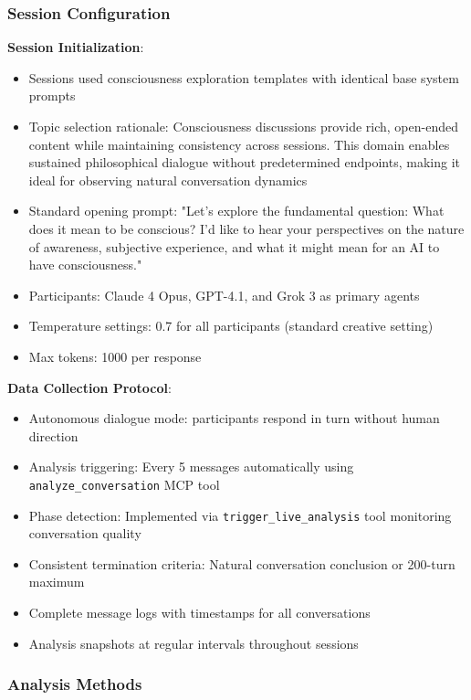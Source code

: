 \documentclass[11pt,letterpaper]{article}
\begin{document}
\subsubsection{Session Configuration}

\textbf{Session Initialization}:
\begin{itemize}
    \item Sessions used consciousness exploration templates with identical base system prompts
    \item Topic selection rationale: Consciousness discussions provide rich, open-ended content while maintaining consistency across sessions. This domain enables sustained philosophical dialogue without predetermined endpoints, making it ideal for observing natural conversation dynamics
    \item Standard opening prompt: "Let's explore the fundamental question: What does it mean to be conscious? I'd like to hear your perspectives on the nature of awareness, subjective experience, and what it might mean for an AI to have consciousness."
    \item Participants: Claude 4 Opus, GPT-4.1, and Grok 3 as primary agents
    \item Temperature settings: 0.7 for all participants (standard creative setting)
    \item Max tokens: 1000 per response
\end{itemize}

\textbf{Data Collection Protocol}:
\begin{itemize}
    \item Autonomous dialogue mode: participants respond in turn without human direction
    \item Analysis triggering: Every 5 messages automatically using \texttt{analyze\_conversation} MCP tool
    \item Phase detection: Implemented via \texttt{trigger\_live\_analysis} tool monitoring conversation quality
    \item Consistent termination criteria: Natural conversation conclusion or 200-turn maximum
    \item Complete message logs with timestamps for all conversations
    \item Analysis snapshots at regular intervals throughout sessions
\end{itemize}

\subsubsection{Analysis Methods}
\end{document}
